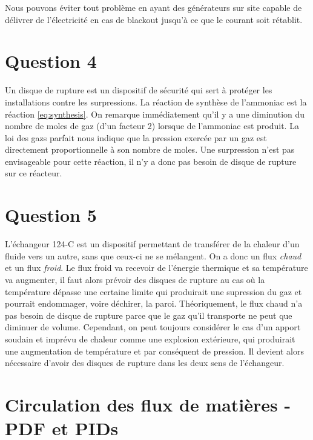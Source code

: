 Nous pouvons éviter tout problème en ayant des générateurs sur site capable 
de délivrer de l'électricité en cas de blackout jusqu'à ce que 
le courant soit rétablit. 

\section*{Question 4}

Un disque de rupture est un dispositif de sécurité qui sert à protéger les installations 
contre les surpressions.
La réaction de synthèse de l'ammoniac est la réaction \ref{eq:synthesis}.
On remarque immédiatement qu'il y a une diminution du nombre de moles de gaz (d'un facteur 2) 
lorsque de l'ammoniac est produit. La loi des gazs parfait nous indique que la pression
exercée par un gaz est directement proportionnelle à son nombre de moles.
Une surpression n'est pas envisageable pour cette réaction, 
il n'y a donc pas besoin de disque de rupture sur ce réacteur.

\section*{Question 5}

L'échangeur 124-C est un dispositif permettant de transférer de la chaleur d'un fluide
vers un autre, sans que ceux-ci ne se mélangent.
On a donc un flux \emph{chaud} et un flux \emph{froid}. Le flux froid va recevoir de 
l'énergie thermique et sa température va augmenter, il faut alors prévoir des disques 
de rupture au cas où la température dépasse une certaine limite qui produirait une 
supression du gaz et pourrait endommager, voire déchirer, la paroi.
Théoriquement, le flux chaud n'a pas besoin de disque de rupture parce que le gaz qu'il 
transporte ne peut que diminuer de volume. Cependant, on peut toujours considérer le cas
d'un apport soudain et imprévu de chaleur comme une explosion extérieure, qui produirait
une augmentation de température et par conséquent de pression. 
Il devient alors nécessaire d'avoir des disques de rupture dans les deux sens de l'échangeur.


\appendix
\section{Circulation des flux de matières - PDF et PIDs}
\label{ann:fluxes}

